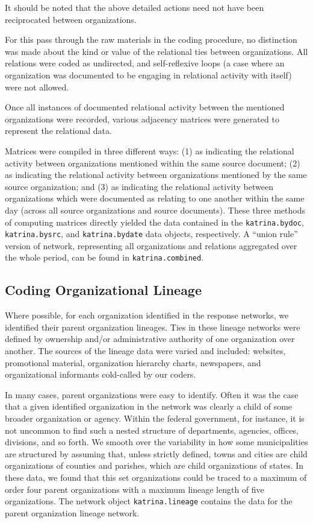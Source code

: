 \documentclass[11pt]{article}
\begin{document}
It should be noted that the above detailed actions need not have been reciprocated between organizations.

For this pass through the raw materials in the coding procedure, no distinction was made about the kind or value of the relational ties between organizations.  All relations were coded as undirected, and self-reflexive loops (a case where an organization was documented to be engaging in relational activity with itself) were not allowed.

Once all instances of documented relational activity between the mentioned organizations were recorded, various adjacency matrices were generated to represent the relational data.

Matrices were compiled in three different ways: (1) as indicating the relational activity between organizations mentioned within the same  source document; (2) as indicating the relational activity between organizations mentioned by the same source organization; and (3) as indicating the relational activity between organizations which were documented as relating to one another within the same day (across all source organizations and source documents).  These three methods of computing matrices directly yielded the data contained in the \texttt{katrina.bydoc}, \texttt{katrina.bysrc}, and \texttt{katrina.bydate} data objects, respectively. A ``union rule'' version of network, representing all organizations and relations aggregated over the whole period, can be found in \texttt{katrina.combined}.

\subsection{Coding Organizational Lineage}
Where possible, for each organization identified in the response networks, we identified their parent organization lineages. Ties in these lineage networks were defined by ownership and/or administrative authority of one organization over another. The sources of the lineage data were varied and included: websites, promotional material, organization hierarchy charts, newspapers, and organizational informants cold-called by our coders. 

In many cases, parent organizations were easy to identify. Often it was the case that a given identified organization in the network was clearly a child of some broader organization or agency.  Within the federal government, for instance, it is not uncommon to find such a nested structure of departments, agencies, offices, divisions, and so forth. We smooth over the variability in how some municipalities are structured by assuming that, unless strictly defined, towns and cities are child organizations of counties and parishes, which are child organizations of states. In these data, we found that this set organizations could be traced to a maximum of order four parent organizations with a maximum lineage length of five organizations. The network object \texttt{katrina.lineage} contains the data for the parent organization lineage network.
\end{document}
